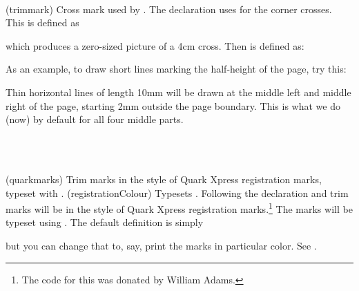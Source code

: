 \begin{syntax}
\cmd{\trimmark} \\
\end{syntax}
\glossary(trimmark)%
  {}%
  {Cross mark used by .}
The declaration \cmd{\trimXmarks} uses \cmd{\trimmark} for the corner 
crosses. This is defined as
\begin{lcode}
\newcommand{\trimmark}{%
  \begin{picture}(0,0)
    \setlength{\unitlength}{1cm}\thicklines
    \put(-2,0){\line(1,0){4}}
    \put(0,-2){\line(0,1){4}}
  \end{picture}}
\end{lcode}
which produces a zero-sized picture of a 4cm cross. Then \cmd{\trimXmarks}
is defined as:
\begin{lcode}
\newcommand*{\trimXmarks}{%
  \let\tmarktl\trimmark
  \let\tmarktr\trimmark
  \let\tmarkbr\trimmark
  \let\tmarkbl\trimmark}
\end{lcode}


    As an example, to draw short lines marking the half-height of the page, 
try this:
\begin{lcode}
\renewcommand*{\tmarkml}{%
  \begin{picture}(0,0)%
    \unitlength 1mm
    \thinlines
    \put(-2,0){\line(-1,0){10}}
  \end{picture}}
\renewcommand*{\tmarkmr}{%
  \begin{picture}(0,0)%
    \unitlength 1mm
    \thinlines
    \put(2,0){\line(1,0){10}}
  \end{picture}}
\end{lcode}
Thin horizontal lines of length 10mm will be drawn at the middle left and
middle right of the page, starting 2mm outside the page boundary. This
is what we do (now) by default for all four middle parts.


\begin{syntax}
\cmd{\quarkmarks} \\
\cmd{\registrationColour} \\
\end{syntax}
\glossary(quarkmarks)%
  {}%
  {Trim marks in the style of Quark Xpress registration marks, typeset with
   .}
\glossary(registrationColour)%
  {}%
  {Typesets .}
Following the declaration \cmd{\quarkmarks} and trim marks will be in
the style of Quark Xpress registration marks.\footnote{The code for this
was donated by William Adams.} The marks will be
typeset using \cmd{\registrationColour}. The default definition is simply
\begin{lcode}
\newcommand*{\RegistrationColour}[1]{#1}
\end{lcode}
but you can change that to, say, print the marks in particular
color. See .


